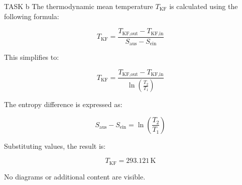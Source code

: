 TASK b  
The thermodynamic mean temperature \( T_{\text{KF}} \) is calculated using the following formula:  

\[
T_{\text{KF}} = \frac{T_{\text{KF,out}} - T_{\text{KF,in}}}{S_{\text{aus}} - S_{\text{ein}}}
\]

This simplifies to:  

\[
T_{\text{KF}} = \frac{T_{\text{KF,out}} - T_{\text{KF,in}}}{\ln\left(\frac{T_2}{T_1}\right)}
\]

The entropy difference is expressed as:  

\[
S_{\text{aus}} - S_{\text{ein}} = \ln\left(\frac{T_2}{T_1}\right)
\]

Substituting values, the result is:  

\[
T_{\text{KF}} = 293.121 \, \text{K}
\]  

No diagrams or additional content are visible.